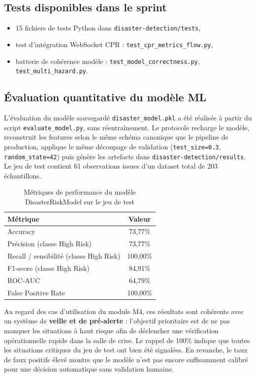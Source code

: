 \subsection{Tests disponibles dans le sprint}
\begin{itemize}
    \item 15 fichiers de tests Python dans \texttt{disaster-detection/tests},
    \item test d'int\'egration WebSocket CPR : \texttt{test\_cpr\_metrics\_flow.py},
    \item batterie de coh\'erence mod\`ele : \texttt{test\_model\_correctness.py}, \texttt{test\_multi\_hazard.py}.
\end{itemize}

\subsection{\'Evaluation quantitative du mod\`ele ML}
L'\'evaluation du mod\`ele sauvegard\'e \texttt{disaster\_model.pkl} a \'et\'e r\'ealis\'ee \`a partir du script \texttt{evaluate\_model.py}, sans r\'eentra\^inement. Le protocole recharge le mod\`ele, reconstruit les features selon le m\^eme sch\'ema canonique que le pipeline de production, applique le m\^eme d\'ecoupage de validation (\texttt{test\_size=0.3}, \texttt{random\_state=42}) puis g\'en\`ere les artefacts dans \texttt{disaster-detection/results}. Le jeu de test contient 61 observations issues d'un dataset total de 203 \'echantillons.

\begin{table}[H]
\centering
\small
\begin{tabular}{|l|c|}
\hline
\textbf{M\'etrique} & \textbf{Valeur} \\
\hline
Accuracy & 73,77\% \\
\hline
Pr\'ecision (classe High Risk) & 73,77\% \\
\hline
Recall / sensibilit\'e (classe High Risk) & 100,00\% \\
\hline
F1-score (classe High Risk) & 84,91\% \\
\hline
ROC-AUC & 64,79\% \\
\hline
False Positive Rate & 100,00\% \\
\hline
\end{tabular}
\caption{M\'etriques de performance du mod\`ele DisasterRiskModel sur le jeu de test}
\label{tab:disaster_model_metrics}
\end{table}

Au regard des cas d'utilisation du module M4, ces r\'esultats sont coh\'erents avec un syst\`eme de \textbf{veille et de pr\'e-alerte} : l'objectif prioritaire est de ne pas manquer les situations \`a haut risque afin de d\'eclencher une v\'erification op\'erationnelle rapide dans la salle de crise. Le rappel de 100\% indique que toutes les situations critiques du jeu de test ont bien \'et\'e signal\'ees. En revanche, le taux de faux positifs \'elev\'e montre que le mod\`ele n'est pas encore suffisamment calibr\'e pour une d\'ecision automatique sans validation humaine.

